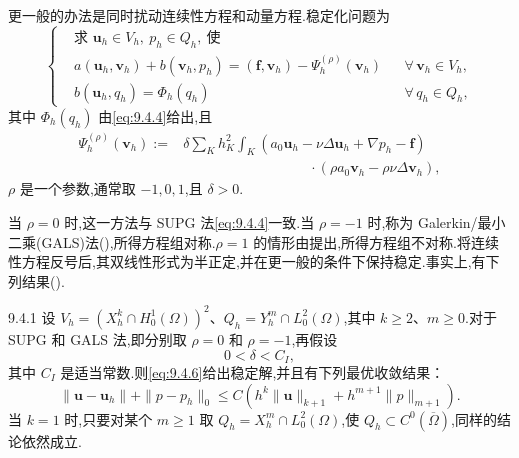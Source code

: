 更一般的办法是同时扰动连续性方程和动量方程.稳定化问题为
\begin{equation}\label{eq:9.4.6}
  \left\{
  \begin{aligned}
    &\text{求 }\boldsymbol{u}_h\in V_h,\ p_h\in Q_h,\ \text{使}\\
    &a(\boldsymbol{u}_h,\boldsymbol{v}_h)+b(\boldsymbol{v}_h,p_h)
       =(\boldsymbol{f},\boldsymbol{v}_h)-\Psi_h^{(\rho)}(\boldsymbol{v}_h)
            &&\forall\,\boldsymbol{v}_h\in V_h,\\
    &b(\boldsymbol{u}_h,q_h)=\Phi_h(q_h)&&\forall\,q_h\in Q_h,
  \end{aligned}
  \right.
\end{equation}
其中 \(\Phi_h(q_h)\) 由\eqref{eq:9.4.4}给出,且
\[
  \begin{aligned}
  \Psi_h^{(\rho)}(\boldsymbol{v}_h):={}&\delta\sum_K h_K^2\int_K
      (a_0\boldsymbol{u}_h-\nu\Delta\boldsymbol{u}_h+\nabla p_h-\boldsymbol{f})\\
      &\hspace{9em}\cdot(\rho a_0\boldsymbol{v}_h-\rho\nu\Delta\boldsymbol{v}_h),
  \end{aligned}
\]
\(\rho\) 是一个参数,通常取 \(-1,0,1\),且 \(\delta>0\).

当 \(\rho=0\) 时,这一方法与 SUPG 法\eqref{eq:9.4.4}一致.当 \(\rho=-1\) 时,称为 Galerkin/最小二乘(GALS)法(),所得方程组对称.\(\rho=1\) 的情形由提出,所得方程组不对称.将连续性方程反号后,其双线性形式为半正定,并在更一般的条件下保持稳定.事实上,有下列结果().

\begin{theorem}[]{9.4.1}
设 \(V_h=(X_h^k\cap H_0^1(\Omega))^2\)、\(Q_h=Y_h^m\cap L_0^2(\Omega)\),其中 \(k\ge2\)、\(m\ge0\).对于 SUPG 和 GALS 法,即分别取 \(\rho=0\) 和 \(\rho=-1\),再假设
\begin{equation}\label{eq:9.4.7}
  0<\delta<C_I,
\end{equation}
其中 \(C_I\) 是适当常数.则\eqref{eq:9.4.6}给出稳定解,并且有下列最优收敛结果：
\begin{equation}\label{eq:9.4.8}
  \|\boldsymbol{u}-\boldsymbol{u}_h\|+\|p-p_h\|_0
       \le C(h^k\|\boldsymbol{u}\|_{k+1}+h^{m+1}\|p\|_{m+1}).
\end{equation}
当 \(k=1\) 时,只要对某个 \(m\ge1\) 取 \(Q_h=X_h^m\cap L_0^2(\Omega)\),使 \(Q_h\subset C^0(\overline\Omega)\),同样的结论依然成立.
\end{theorem}

